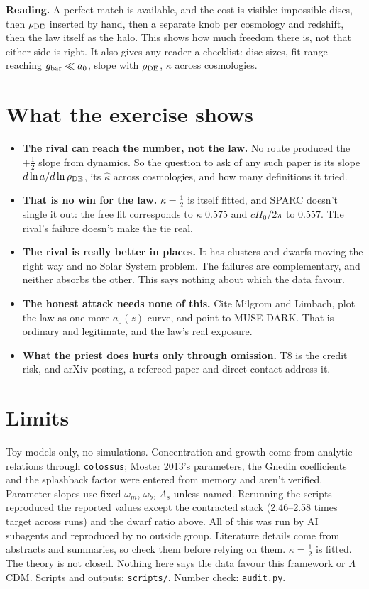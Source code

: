 \documentclass[10pt]{article}
\begin{document}
\textbf{Reading.} A perfect match is available, and the cost is visible: impossible discs, then $\rho_{\rm DE}$ inserted by hand, then a separate knob per cosmology and redshift, then the law itself as the halo. This shows how much freedom there is, not that either side is right. It also gives any reader a checklist: disc sizes, fit range reaching $g_{\rm bar}\ll a_0$, slope with $\rho_{\rm DE}$, $\kappa$ across cosmologies.

\section*{What the exercise shows}
\begin{itemize}
\item \textbf{The rival can reach the number, not the law.} No route produced the $+\tfrac12$ slope from dynamics. So the question to ask of any such paper is its slope $d\ln a/d\ln\rho_{\rm DE}$, its $\hat\kappa$ across cosmologies, and how many definitions it tried.
\item \textbf{That is no win for the law.} $\kappa=\tfrac12$ is itself fitted, and SPARC doesn't single it out: the free fit corresponds to $\kappa$ 0.575 and $cH_0/2\pi$ to 0.557. The rival's failure doesn't make the tie real.
\item \textbf{The rival is really better in places.} It has clusters and dwarfs moving the right way and no Solar System problem. The failures are complementary, and neither absorbs the other. This says nothing about which the data favour.
\item \textbf{The honest attack needs none of this.} Cite Milgrom and Limbach, plot the law as one more $a_0(z)$ curve, and point to MUSE-DARK. That is ordinary and legitimate, and the law's real exposure.
\item \textbf{What the priest does hurts only through omission.} T8 is the credit risk, and arXiv posting, a refereed paper and direct contact address it.
\end{itemize}

\section*{Limits}
Toy models only, no simulations. Concentration and growth come from analytic relations through \texttt{colossus}; Moster 2013's parameters, the Gnedin coefficients and the splashback factor were entered from memory and aren't verified. Parameter slopes use fixed $\omega_m$, $\omega_b$, $A_s$ unless named. Rerunning the scripts reproduced the reported values except the contracted stack (2.46--2.58 times target across runs) and the dwarf ratio above. All of this was run by AI subagents and reproduced by no outside group. Literature details come from abstracts and summaries, so check them before relying on them. $\kappa=\tfrac12$ is fitted. The theory is not closed. Nothing here says the data favour this framework or $\Lambda$CDM. Scripts and outputs: \texttt{scripts/}. Number check: \texttt{audit.py}.
\end{document}
